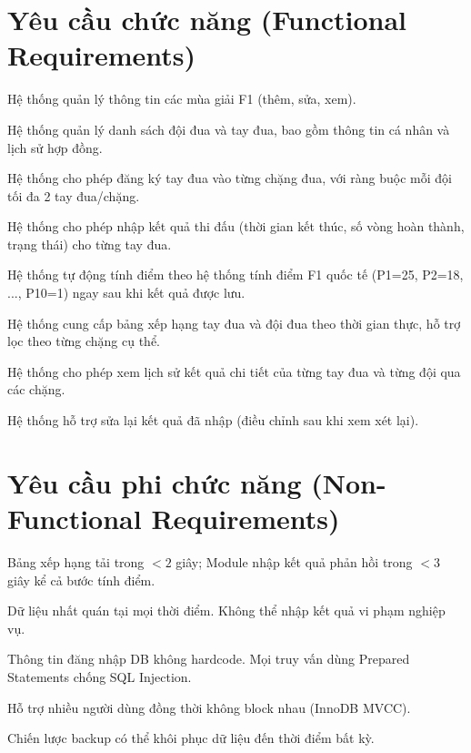 \documentclass[13pt, a4paper]{report}
\begin{document}
\section{Yêu cầu chức năng (Functional Requirements)}

\begin{description}[leftmargin=1.5cm, style=nextline]
  \item[FR-01] Hệ thống quản lý thông tin các mùa giải F1 (thêm, sửa, xem).
  \item[FR-02] Hệ thống quản lý danh sách đội đua và tay đua, bao gồm thông tin cá nhân và lịch sử hợp đồng.
  \item[FR-03] Hệ thống cho phép đăng ký tay đua vào từng chặng đua, với ràng buộc mỗi đội tối đa 2 tay đua/chặng.
  \item[FR-04] Hệ thống cho phép nhập kết quả thi đấu (thời gian kết thúc, số vòng hoàn thành, trạng thái) cho từng tay đua.
  \item[FR-05] Hệ thống tự động tính điểm theo hệ thống tính điểm F1 quốc tế (P1=25, P2=18, ..., P10=1) ngay sau khi kết quả được lưu.
  \item[FR-06] Hệ thống cung cấp bảng xếp hạng tay đua và đội đua theo thời gian thực, hỗ trợ lọc theo từng chặng cụ thể.
  \item[FR-07] Hệ thống cho phép xem lịch sử kết quả chi tiết của từng tay đua và từng đội qua các chặng.
  \item[FR-08] Hệ thống hỗ trợ sửa lại kết quả đã nhập (điều chỉnh sau khi xem xét lại).
\end{description}

\section{Yêu cầu phi chức năng (Non-Functional Requirements)}

\begin{description}[leftmargin=1.5cm, style=nextline]
  \item[Hiệu năng] Bảng xếp hạng tải trong $<2$ giây; Module nhập kết quả phản hồi trong $<3$ giây kể cả bước tính điểm.
  \item[Toàn vẹn dữ liệu] Dữ liệu nhất quán tại mọi thời điểm. Không thể nhập kết quả vi phạm nghiệp vụ.
  \item[Bảo mật] Thông tin đăng nhập DB không hardcode. Mọi truy vấn dùng Prepared Statements chống SQL Injection.
  \item[Khả dụng] Hỗ trợ nhiều người dùng đồng thời không block nhau (InnoDB MVCC).
  \item[Phục hồi] Chiến lược backup có thể khôi phục dữ liệu đến thời điểm bất kỳ.
\end{description}
\end{document}
